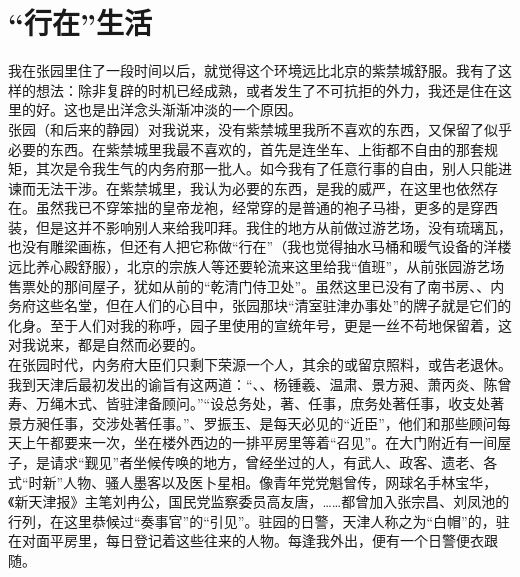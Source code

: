\fancyhead[RO]{} %
\fancyhead[LE]{} %
\chapter*{“行在”生活}
\thispagestyle{empty}
我在张园里住了一段时间以后，就觉得这个环境远比北京的紫禁城舒服。我有了这样的想法：除非复辟的时机已经成熟，或者发生了不可抗拒的外力，我还是住在这里的好。这也是出洋念头渐渐冲淡的一个原因。\\

张园（和后来的静园）对我说来，没有紫禁城里我所不喜欢的东西，又保留了似乎必要的东西。在紫禁城里我最不喜欢的，首先是连坐车、上街都不自由的那套规矩，其次是令我生气的内务府那一批人。如今我有了任意行事的自由，别人只能进谏而无法干涉。在紫禁城里，我认为必要的东西，是我的威严，在这里也依然存在。虽然我已不穿笨拙的皇帝龙袍，经常穿的是普通的袍子马褂，更多的是穿西装，但是这并不影响别人来给我叩拜。我住的地方从前做过游艺场，没有琉璃瓦，也没有雕梁画栋，但还有人把它称做“行在”（我也觉得抽水马桶和暖气设备的洋楼远比养心殿舒服），北京的宗族人等还要轮流来这里给我“值班”，从前张园游艺场售票处的那间屋子，犹如从前的“乾清门侍卫处”。虽然这里已没有了南书房、、内务府这些名堂，但在人们的心目中，张园那块“清室驻津办事处”的牌子就是它们的化身。至于人们对我的称呼，园子里使用的宣统年号，更是一丝不苟地保留着，这对我说来，都是自然而必要的。\\

在张园时代，内务府大臣们只剩下荣源一个人，其余的或留京照料，或告老退休。我到天津后最初发出的谕旨有这两道：“、、杨锺羲、温肃、景方昶、萧丙炎、陈曾寿、万绳木式、皆驻津备顾问。”“设总务处，著、任事，庶务处著任事，收支处著景方昶任事，交涉处著任事。”、罗振玉、是每天必见的“近臣”，他们和那些顾问每天上午都要来一次，坐在楼外西边的一排平房里等着“召见”。在大门附近有一间屋子，是请求“觐见”者坐候传唤的地方，曾经坐过的人，有武人、政客、遗老、各式“时新”人物、骚人墨客以及医卜星相。像青年党党魁曾传，网球名手林宝华，《新天津报》主笔刘冉公，国民党监察委员高友唐，……都曾加入张宗昌、刘凤池的行列，在这里恭候过“奏事官”的“引见”。驻园的日警，天津人称之为“白帽”的，驻在对面平房里，每日登记着这些往来的人物。每逢我外出，便有一个日警便衣跟随。\\

